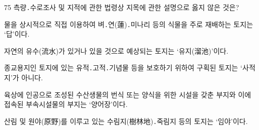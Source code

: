 \begin{question}{75}
측량․수로조사 및 지적에 관한 법령상 지목에 관한 설명으로 옳지 않은 것은?
\begin{choices}
  \item 물을 상시적으로 직접 이용하여 벼․연(蓮)․미나리 등의 식물을 주로 재배하는 토지는 ‘답’이다.
  \item 자연의 유수(流水)가 있거나 있을 것으로 예상되는 토지는 ‘유지(溜池)’이다.
  \item 종교용지인 토지에 있는 유적․고적․기념물 등을 보호하기 위하여 구획된 토지는 ‘사적지’가 아니다.
  \item 육상에 인공으로 조성된 수산생물의 번식 또는 양식을 위한 시설을 갖춘 부지와 이에 접속된 부속시설물의 부지는 ‘양어장’이다.
  \item 산림 및 원야(原野)를 이루고 있는 수림지(樹林地)․죽림지 등의 토지는 ‘임야’이다.
\end{choices}
\end{question}
